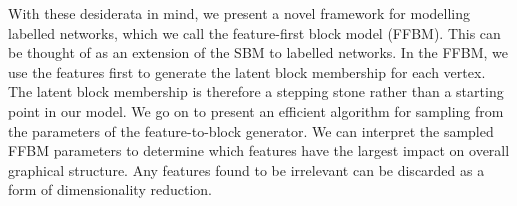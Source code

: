 With these desiderata in mind, we present a novel framework for modelling labelled networks, which we call the feature-first block model (FFBM). This can be thought of as an extension of the SBM to labelled networks. In the FFBM, we use the features first to generate the latent block membership for each vertex. The latent block membership is therefore a stepping stone rather than a starting point in our model. We go on to present an efficient algorithm for sampling from the parameters of the feature-to-block generator. We can interpret the sampled FFBM parameters to determine which features have the largest impact on overall graphical structure. Any features found to be irrelevant can be discarded as a form of dimensionality reduction.